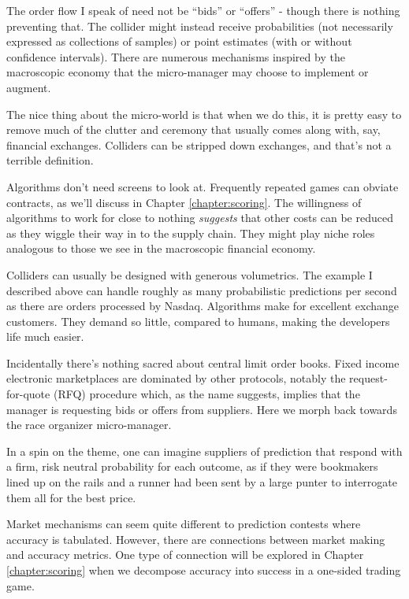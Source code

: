 The order flow I speak of need not be ``bids'' or ``offers'' - though there is nothing preventing that. The collider might instead receive probabilities (not necessarily expressed as collections of samples) or point estimates (with or without confidence intervals). There are numerous mechanisms inspired by the macroscopic economy that the micro-manager may choose to implement or augment. 

The nice thing about the micro-world is that when we do this, it is pretty easy to remove much of the clutter and ceremony that usually comes along with, say, financial exchanges. Colliders can be stripped down exchanges, and that's not a terrible definition.  

Algorithms don't need screens to look at. Frequently repeated games can obviate contracts, as we'll discuss in Chapter \ref{chapter:scoring}. The willingness of algorithms to work for close to nothing {\em suggests} that other costs can be reduced as they wiggle their way in to the supply chain. They might play niche roles analogous to those we see in the macroscopic financial economy. 


Colliders can usually be designed with generous volumetrics. The example I described above can handle roughly as many probabilistic predictions per second as there are orders processed by Nasdaq. Algorithms make for excellent exchange customers. They demand so little, compared to humans, making the developers life much easier.   


Incidentally there's nothing sacred about central limit order books. Fixed income electronic marketplaces are dominated by other protocols, notably the request-for-quote (RFQ) procedure which, as the name suggests, implies that the manager is requesting bids or offers from suppliers. Here we morph back towards the race organizer micro-manager. 


In a spin on the theme, one can imagine suppliers of prediction that respond with a firm, risk neutral probability for each outcome, as if they were bookmakers lined up on the rails and a runner had been sent by a large punter to interrogate them all for the best price. 


Market mechanisms can seem quite different to prediction contests where accuracy is tabulated. However, there are connections between market making and accuracy metrics. One type of connection will be explored in Chapter \ref{chapter:scoring} when we decompose accuracy into success in a one-sided trading game.  


